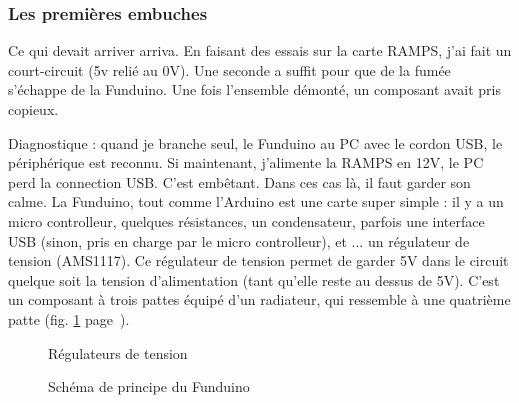 \subsubsection{Les premières embuches}
Ce qui devait arriver arriva. En faisant des essais sur la carte RAMPS, j'ai fait un %
court-circuit (5v relié au 0V). Une seconde a suffit pour que de la fumée s'échappe %
de la Funduino. Une %
fois l'ensemble démonté, un composant avait pris copieux. \par %
Diagnostique : quand je branche seul, le Funduino au PC avec le cordon USB, le %
périphérique est reconnu. Si maintenant, j'alimente la RAMPS en 12V, le PC perd la %
connection USB. C'est embêtant. Dans ces cas là, il faut garder son calme. La %
Funduino, tout comme l'Arduino est une carte super simple : il y a un micro controlleur, %
quelques résistances, un condensateur, parfois une interface USB (sinon, pris en charge %
par le micro controlleur), et ... un régulateur de tension (AMS1117). Ce régulateur de %
tension permet de garder 5V dans le circuit quelque soit la tension d'alimentation (tant %
qu'elle reste au dessus de 5V). C'est un composant à trois pattes équipé d'un radiateur, qui %
ressemble à une quatrième patte (fig. \ref{regulator} page~\pageref{regulator}). %
\begin{figure}%
   \caption{\label{regulator} Régulateurs de tension}%
\end{figure}%
\begin{figure}%
   \caption{\label{arduino_principle} Schéma de principe du Funduino}%
\end{figure}%

